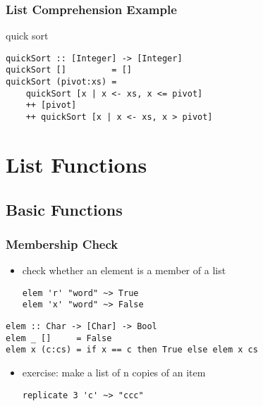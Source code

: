 \documentclass[dvipsnames]{beamer}
\theoremstyle{plain}
\begin{document}
\begin{frame}[fragile]
  \frametitle{List Comprehension Example}

  \begin{exampleblock}{quick sort}
    \begin{lstlisting}
quickSort :: [Integer] -> [Integer]
quickSort []         = []
quickSort (pivot:xs) =
    quickSort [x | x <- xs, x <= pivot]
    ++ [pivot]
    ++ quickSort [x | x <- xs, x > pivot]
    \end{lstlisting}
  \end{exampleblock}
\end{frame}

\section{List Functions}

\subsection{Basic Functions}

\begin{frame}[fragile]
  \frametitle{Membership Check}

  \begin{itemize}
    \item check whether an element is a member of a list
    \begin{lstlisting}[frame=none]
elem 'r' "word" ~> True
elem 'x' "word" ~> False
    \end{lstlisting}
  \end{itemize}

  \pause
  \begin{exampleblock}{}
    \begin{lstlisting}[deletekeywords={elem}]
elem :: Char -> [Char] -> Bool
elem _ []     = False
elem x (c:cs) = if x == c then True else elem x cs
    \end{lstlisting}
  \end{exampleblock}

  \pause
  \begin{itemize}
    \item exercise: make a list of n copies of an item
    \begin{lstlisting}[frame=none]
replicate 3 'c' ~> "ccc"
    \end{lstlisting}
  \end{itemize}
\end{frame}
\end{document}
